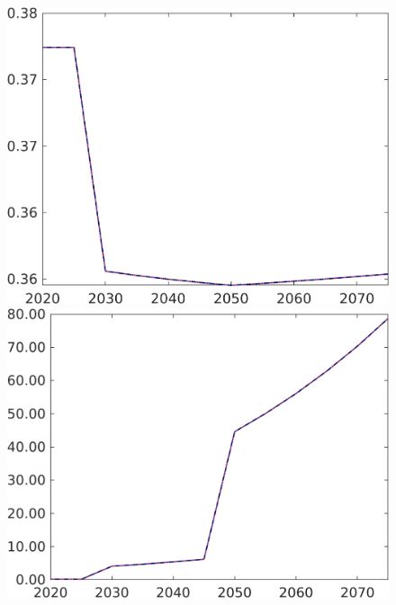 \begin{figure}[h!!]
\begin{minipage}[]{0.32\textwidth}
	\end{minipage}
	\begin{minipage}[]{0.32\textwidth}
		\includegraphics[width=1\textwidth]{../../codding_model/own_basedOnFried/optimalPol_190722_tidiedUp/figures/all_July22/hl_CompEffOPT_T_NoTaus_pol4_spillover0_noskill1_sep1_xgrowth1_etaa0.79_lgd0_lff0.png}
	\end{minipage}
	\begin{minipage}[]{0.32\textwidth}
		\includegraphics[width=1\textwidth]{../../codding_model/own_basedOnFried/optimalPol_190722_tidiedUp/figures/all_July22/GFF_CompEffOPT_T_NoTaus_pol4_spillover0_noskill1_sep1_xgrowth1_etaa0.79_lgd0_lff0.png}

\end{minipage}
\end{figure}

